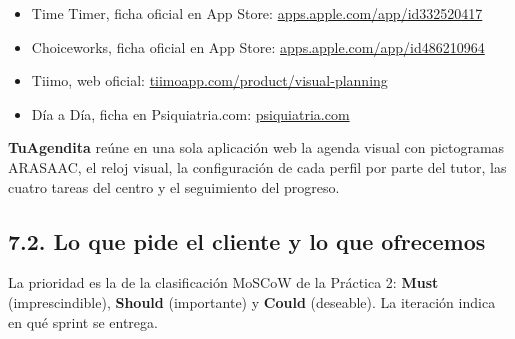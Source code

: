 \documentclass[11pt,a4paper]{article}
\newcommand{\hl}[1]{\textcolor{gblue}{\textbf{#1}}}
\begin{document}
\begin{itemize}
\item [1] Time Timer, ficha oficial en App Store: \href{https://apps.apple.com/us/app/-/id332520417}{\textcolor{gblue}{apps.apple.com/app/id332520417}}
\item [2] Choiceworks, ficha oficial en App Store: \href{https://apps.apple.com/app/id486210964}{\textcolor{gblue}{apps.apple.com/app/id486210964}}
\item [3] Tiimo, web oficial: \href{https://tiimoapp.com/product/visual-planning}{\textcolor{gblue}{tiimoapp.com/product/visual-planning}}
\item [4] Día a Día, ficha en Psiquiatria.com: \href{https://psiquiatria.com/trastornos-infantiles-y-de-la-adolescencia/dia-a-dia-50950/}{\textcolor{gblue}{psiquiatria.com}}
\end{itemize}
\hl{TuAgendita} reúne en una sola aplicación web la agenda visual con pictogramas ARASAAC, el reloj visual, la configuración de cada perfil por parte del tutor, las cuatro tareas del centro y el seguimiento del progreso.


\subsection*{7.2. Lo que pide el cliente y lo que ofrecemos}
La prioridad es la de la clasificación MoSCoW de la Práctica 2: \hl{Must} (imprescindible), \hl{Should} (importante) y \hl{Could} (deseable). La iteración indica en qué sprint se entrega.
\end{document}
